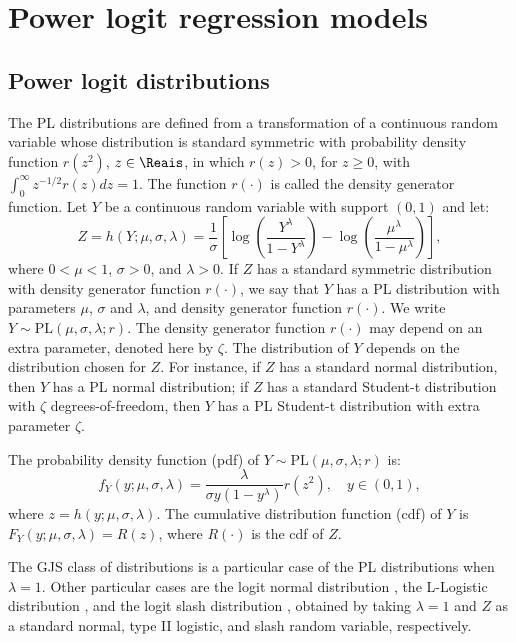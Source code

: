 \section{Power logit regression models}\label{PLmodel}

\subsection{Power logit distributions}
The PL distributions \citep{QueirozFerrari2023} are defined from a transformation of a continuous random variable whose distribution is standard symmetric with probability density function $r(z^2)$, $z\in \Reais$, in which $r(z)>0$, for $z \geq 0$, with $\int_0^\infty z^{-1/2} r(z) dz=1$. The function $r(\cdot)$ is called the density generator function. Let $Y$ be a continuous random variable with support $(0,1)$ and let:
%
\begin{equation*}
Z = h(Y; \mu, \sigma, \lambda) = \dfrac{1}{\sigma} \left[ \log \left( \dfrac{Y^\lambda}{1-Y^\lambda} \right) - \log \left( \dfrac{\mu^\lambda}{1-\mu^\lambda} \right)\right],
\end{equation*}
%
where $0< \mu<1$, $\sigma>0$, and $\lambda>0$. If $Z$ has a standard symmetric distribution with density generator function $r(\cdot)$, we say that $Y$ has a PL distribution with parameters $\mu$, $\sigma$ and $\lambda$, and density generator function $r(\cdot)$. We write $Y \sim \mbox{PL} (\mu, \sigma, \lambda; r)$.  The density generator function $r(\cdot)$ may depend on an extra parameter, denoted here by $\zeta$. The distribution of $Y$ depends on the distribution chosen for $Z$. For instance, if $Z$ has a standard normal distribution, then $Y$ has a PL normal distribution; if $Z$ has a standard Student-t distribution with $\zeta$ degrees-of-freedom, then $Y$ has a PL Student-t distribution with extra parameter $\zeta$. 

The probability density function (pdf) of $Y \sim \mbox{PL} (\mu, \sigma, \lambda; r)$ is:
%
\begin{equation*}
f_Y(y; \mu, \sigma, \lambda)= \frac{\lambda}{\sigma y(1-y^\lambda)} r (z^2), \quad y \in (0,1),
\end{equation*}
%
where $z=h(y; \mu, \sigma, \lambda)$. The cumulative distribution function (cdf) of $Y$ is $F_Y(y; \mu, \sigma, \lambda) = R(z)$, where $R(\cdot)$ is the cdf of $Z$.

The GJS class of distributions is a particular case of the PL distributions when $\lambda =1$. Other particular cases are the logit normal distribution \citep{Johnson1949}, the L-Logistic distribution \citep{daPazetal2019}, and the logit slash distribution \citep{Korkmaz2020}, obtained by taking $\lambda =1$ and $Z$ as a standard normal, type II logistic, and slash random variable, respectively.


